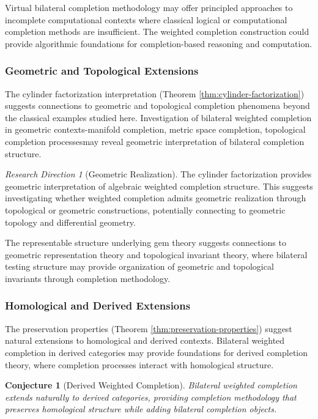 \documentclass[11pt]{article}
\theoremstyle{plain}
\newtheorem{conjecture}[theorem]{Conjecture}
\theoremstyle{definition}
\theoremstyle{remark}
\newtheorem{research_direction}[theorem]{Research Direction}
\begin{document}
Virtual bilateral completion methodology may offer principled approaches to incomplete computational contexts where classical logical or computational completion methods are insufficient. The weighted completion construction could provide algorithmic foundations for completion-based reasoning and computation.

\subsubsection{Geometric and Topological Extensions}

The cylinder factorization interpretation (Theorem \ref{thm:cylinder-factorization}) suggests connections to geometric and topological completion phenomena beyond the classical examples studied here. Investigation of bilateral weighted completion in geometric contexts-manifold completion, metric space completion, topological completion processesmay reveal geometric interpretation of bilateral completion structure.

\begin{research_direction}[Geometric Realization]
The cylinder factorization provides geometric interpretation of algebraic weighted completion structure. This suggests investigating whether weighted completion admits geometric realization through topological or geometric constructions, potentially connecting to geometric topology and differential geometry.
\end{research_direction}

The representable structure underlying gem theory suggests connections to geometric representation theory and topological invariant theory, where bilateral testing structure may provide organization of geometric and topological invariants through completion methodology.

\subsubsection{Homological and Derived Extensions}

The preservation properties (Theorem \ref{thm:preservation-properties}) suggest natural extensions to homological and derived contexts. Bilateral weighted completion in derived categories may provide foundations for derived completion theory, where completion processes interact with homological structure.

\begin{conjecture}[Derived Weighted Completion]
Bilateral weighted completion extends naturally to derived categories, providing completion methodology that preserves homological structure while adding bilateral completion objects.
\end{conjecture}
\end{document}
